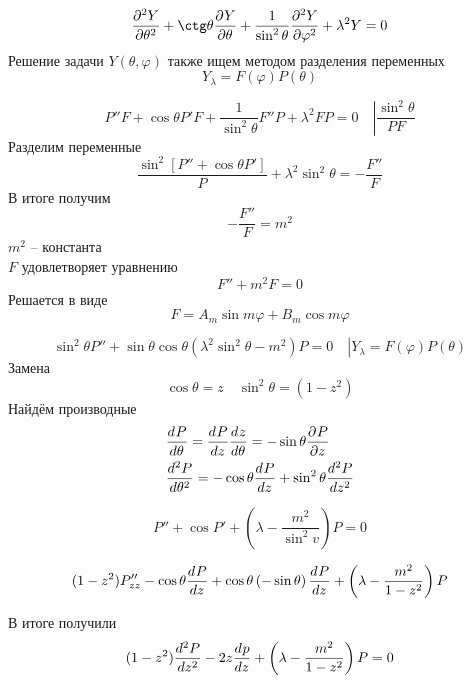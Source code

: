 \[
    \derp{Y}{\theta}{2} + \ctg \theta \derp{Y}{\theta}{} + \frac{1}{\sin^2 \theta} \derp{Y}{\varphi}{2} + \lambda^2 Y = 0
\]
Решение задачи $Y(\theta, \varphi)$ также ищем методом разделения переменных
\[
    Y_\lambda = F(\varphi) P(\theta)
\]

\[
    \left. P'' F + \cos \theta P' F + \frac{1}{\sin^2 \theta} F'' P + \lambda^2 F P = 0\quad \right| \frac{\sin^2 \theta}{P F}
\]
Разделим переменные
\[
    \frac{\sin^2 \left[P'' + \cos \theta P' \right]}{P} + \lambda^2 \sin^2 \theta = - \frac{F''}{F} 
\]
В итоге получим
\[
    - \frac{F''}{F} = m^2 
\]
$m^2$ -- константа\\

$F$ удовлетворяет уравнению
\[ 
     F'' + m^2 F = 0
\]
Решается в виде
\[ 
     F = A_m \sin m \varphi + B_m \cos m \varphi
\]

\[
    \left. \sin^2 \theta P'' + \sin \theta \cos \theta (\lambda^2 \sin^2 \theta - m^2) P = 0 \quad \right|  Y_\lambda = F(\varphi) P(\theta)
\]
Замена
\[
    \cos \theta = z \quad \sin^2 \theta = (1 - z^2)
\]
Найдём производные
\begin{align*}
    &\frac{d^{}P}{d\theta^{}} = \frac{d^{}P}{dz^{}} \frac{d^{}z}{d\theta^{}} = - \sin \theta \frac{\partial^{}P}{\partial z^{}}\\
    &\frac{d^{2}P}{d\theta^{2}} = - \cos \theta \frac{d^{}P}{dz^{}} + \sin^2 \theta \frac{d^{2}P}{dz^{2}}
\end{align*}

\[
    P'' + \cos P' + \left(\lambda - \frac{m^2}{\sin^2 v} \right) P = 0
\]

\[
    (1 - z^2)P''_{zz} - \cos \theta \frac{d^{}P}{dz^{}} + \cos \theta \left(- \sin \theta\right) \frac{d^{}P}{dz^{}} + \left(\lambda - \frac{m^2}{1 - z^2}\right) P
\]

В итоге получили
\[
     (1 - z^2) \frac{d^{2}P}{dz^{2}} - 2 z \frac{d^{}p}{dz^{}} + \left(\lambda - \frac{m^2}{1 - z^2} \right) P = 0
\]
